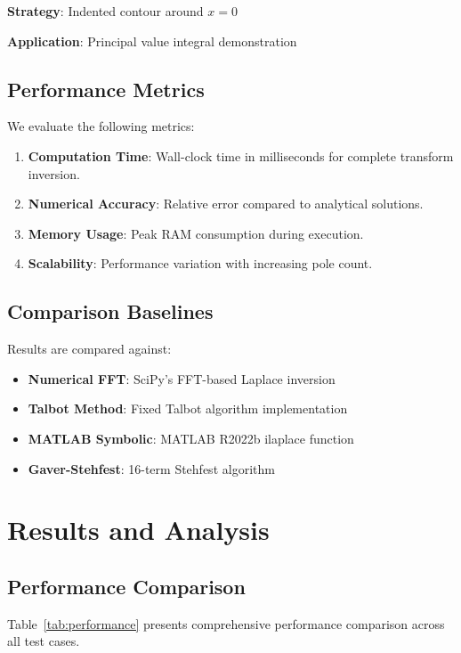 \documentclass[conference]{IEEEtran}
\begin{document}
\textbf{Strategy}: Indented contour around $x = 0$

\textbf{Application}: Principal value integral demonstration

\subsection{Performance Metrics}

We evaluate the following metrics:

\begin{enumerate}
    \item \textbf{Computation Time}: Wall-clock time in milliseconds for complete transform inversion.
    \item \textbf{Numerical Accuracy}: Relative error compared to analytical solutions.
    \item \textbf{Memory Usage}: Peak RAM consumption during execution.
    \item \textbf{Scalability}: Performance variation with increasing pole count.
\end{enumerate}

\subsection{Comparison Baselines}

Results are compared against:

\begin{itemize}
    \item \textbf{Numerical FFT}: SciPy's FFT-based Laplace inversion
    \item \textbf{Talbot Method}: Fixed Talbot algorithm implementation
    \item \textbf{MATLAB Symbolic}: MATLAB R2022b ilaplace function
    \item \textbf{Gaver-Stehfest}: 16-term Stehfest algorithm
\end{itemize}

\section{Results and Analysis}

\subsection{Performance Comparison}

Table~\ref{tab:performance} presents comprehensive performance comparison across all test cases.
\end{document}

